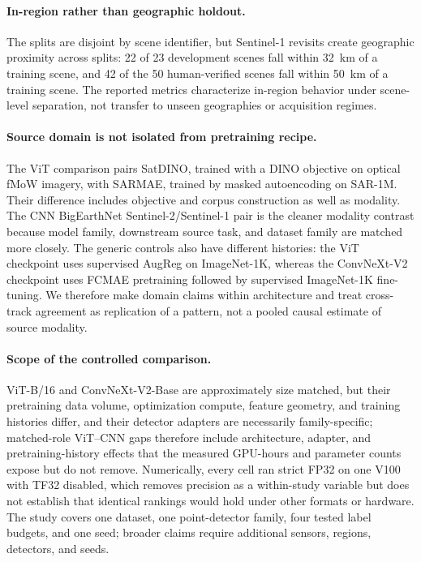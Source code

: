 \paragraph{In-region rather than geographic holdout.}
The splits are disjoint by scene identifier, but Sentinel-1 revisits create
geographic proximity across splits: 22 of 23 development scenes fall within
32~km of a training scene, and 42 of the 50 human-verified scenes fall within
50~km of a training scene. The reported metrics characterize in-region
behavior under scene-level separation, not transfer to unseen geographies or
acquisition regimes.

\paragraph{Source domain is not isolated from pretraining recipe.}
The ViT comparison pairs SatDINO, trained with a DINO objective on optical
fMoW imagery, with SARMAE, trained by masked autoencoding on SAR-1M. Their
difference includes objective and corpus construction as well as modality.
The CNN BigEarthNet Sentinel-2/Sentinel-1 pair is the cleaner modality
contrast because model family, downstream source task, and dataset family are
matched more closely. The generic controls also have different histories:
the ViT checkpoint uses supervised AugReg on ImageNet-1K, whereas the
ConvNeXt-V2 checkpoint uses FCMAE pretraining followed by supervised
ImageNet-1K fine-tuning. We therefore make domain claims within architecture
and treat cross-track agreement as replication of a pattern, not a pooled
causal estimate of source modality.

\paragraph{Scope of the controlled comparison.}
ViT-B/16 and ConvNeXt-V2-Base are approximately size matched, but their
pretraining data volume, optimization compute, feature geometry, and
training histories differ, and their detector adapters are necessarily
family-specific; matched-role ViT--CNN gaps therefore include architecture,
adapter, and pretraining-history effects that the measured GPU-hours and
parameter counts expose but do not remove. Numerically, every cell ran
strict FP32 on one V100 with TF32 disabled, which removes precision as a
within-study variable but does not establish that identical rankings would
hold under other formats or hardware. The study covers one dataset, one
point-detector family, four tested label budgets, and one seed; broader
claims require additional sensors, regions, detectors, and seeds.
